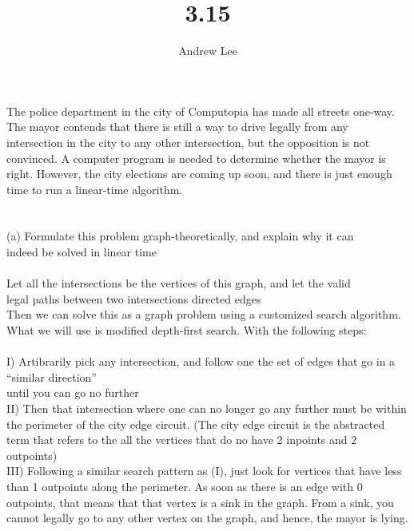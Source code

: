 \documentclass[10pt,a4paper,oneside]{article}
\begin{document}
\title{3.15}\author{Andrew Lee}\maketitle{}

\textrm{ The police department in the city of Computopia has made all streets one-way.}\\\textrm{The mayor contends that there is still a way to drive legally from any}\\\textrm{intersection in the city to any other intersection, but the opposition is not}\\\textrm{convinced. A computer program is needed to determine whether the mayor is}\\\textrm{right. However, the city elections are coming up soon, and there is just enough}\\\textrm{time to run a linear-time algorithm.}\\\\\\
\textrm{(a) Formulate this problem graph-theoretically, and explain why it can}\\\textrm{indeed be solved in linear time}\\\\
\textrm{Let all the intersections be the vertices of this graph, and let the valid \\legal paths between two intersections directed edges}\\\textrm{Then we can solve this as a graph problem using a customized search algorithm.}\\\textrm{What we will use is modified depth-first search. With the following steps:}\\\\
\textrm{I)	Artibrarily pick any intersection, and follow one the set of edges that go in a ``similar direction''}\\\textrm{until you can go no further}\\
\textrm{II) Then that intersection where one can no longer go any further must be within the perimeter of the city edge circuit. (The city edge circuit is the abstracted term that refers to the all the vertices that do no have 2 inpoints and 2 outpoints)}\\
\textrm{III) Following a similar search pattern as (I), just look for vertices that have less than 1 outpoints along the perimeter. As soon as there is an edge with 0 outpoints, that means that that vertex is a sink in the graph. From a sink, you cannot legally go to any other vertex on the graph, and hence, the mayor is lying.}\\\\
\end{document}
